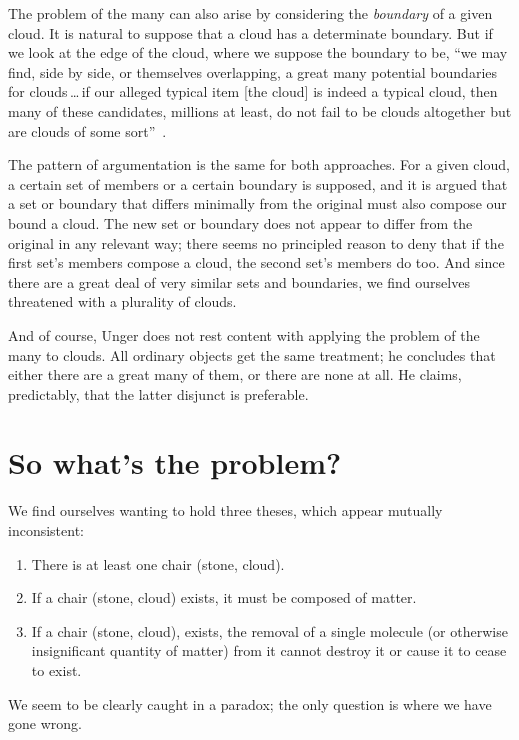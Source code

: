 \documentclass[11pt]{standalone} \newif\ifstandlone \standalonetrue
\begin{document}
\begin{spacing}{1.5}
The problem of the many can also arise by considering the {\em
  boundary} of a given cloud.  It is natural to suppose that a cloud
has a determinate boundary.  But if we look at the edge of the cloud,
where we suppose the boundary to be, ``we may find, side by side, or
themselves overlapping, a great many potential boundaries for
clouds\,\ldots\,if our alleged typical item {[}the cloud{]} is indeed
a typical cloud, then many of these candidates, millions at least, do
not fail to be clouds altogether but are clouds of some
sort''~\citep[420--421]{unger1980a}.

The pattern of argumentation is the same for both approaches.  For a
given cloud, a certain set of members or a certain boundary is
supposed, and it is argued that a set or boundary that differs
minimally from the original must also compose our bound a cloud.  The
new set or boundary does not appear to differ from the original in any
relevant way; there seems no principled reason to deny that if the
first set's members compose a cloud, the second set's members do too.
And since there are a great deal of very similar sets and boundaries,
we find ourselves threatened with a plurality of clouds.

And of course, Unger does not rest content with applying the problem
of the many to clouds.  All ordinary objects get the same treatment;
he concludes that either there are a great many of them, or there are
none at all.  He claims, predictably, that the latter disjunct is
preferable.

\section{So what's the problem?}
We find ourselves wanting to hold three theses, which appear mutually
inconsistent:

\begin{enumerate}
  \item There is at least one chair (stone, cloud).
  \item If a chair (stone, cloud) exists, it must be composed of
    matter.
  \item If a chair (stone, cloud), exists, the removal of a single
    molecule (or otherwise insignificant quantity of matter) from it
    cannot destroy it or cause it to cease to exist.
\end{enumerate}

We seem to be clearly caught in a paradox; the only question is where
we have gone wrong.


\end{spacing}
\end{document}
